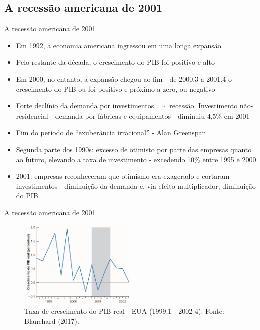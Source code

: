 \documentclass[10pt]{beamer}
\begin{document}
\subsection{A recessão americana de 2001}
\begin{frame}{A recessão americana de 2001}
    \begin{itemize}
        \item Em 1992, a economia americana ingressou em uma longa expansão
        \bigskip
        \item Pelo restante da década, o crescimento do PIB foi positivo e alto
        \bigskip
        \item Em 2000, no entanto, a expansão chegou ao fim - de 2000.3 a 2001.4 o crescimento do PIB ou foi positivo e próximo a zero, ou negativo
        \bigskip
        \item Forte declínio da demanda por investimentos $\Rightarrow$ recessão. Investimento não-residencial - demanda por fábricas e equipamentos - diminuiu 4,5\% em 2001
        \bigskip
        \item Fim do período de \href{https://en.wikipedia.org/wiki/Irrational_exuberance}{``exuberância irracional''} - \href{https://en.wikipedia.org/wiki/Alan_Greenspan}{Alan Greenspan}
        \bigskip
        \item Segunda parte dos 1990s: excesso de otimisto por parte das empresas quanto ao futuro, elevando a taxa de investimento - excedendo 10\% entre 1995 e 2000
        \bigskip
        \item 2001: empresas reconheceram que otimismo era exagerado e cortaram investimentos - diminuição da demanda e, via efeito multiplicador, diminuição do PIB
    \end{itemize}
\end{frame}

\begin{frame}{A recessão americana de 2001}
\begin{figure}
    \centering
    \includegraphics[width=0.5\textwidth]{./figures/aula082_fig11.JPG}
    \caption{Taxa de crescimento do PIB real - EUA (1999.1 - 2002-4). Fonte: Blanchard (2017).}
    \label{fig5}
\end{figure}
\end{frame}
\end{document}
